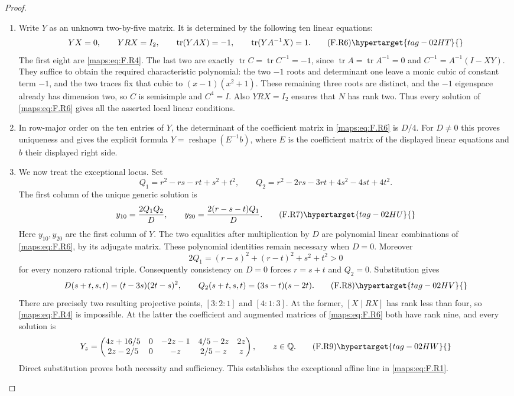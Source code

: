 \begin{proof}
\begin{enumerate}[label={$\langle1\rangle$\arabic*.}]
\item Write $Y$ as an unknown two-by-five matrix.  It is determined
by the following ten linear equations:
\[
 YX=0,\qquad YRX=I_2,\qquad
 \operatorname{tr}(YAX)=-1,\qquad
 \operatorname{tr}(YA^{-1}X)=1.
 \tag{F.R6}\hypertarget{tag-02HT}{}\label{maps:eq:F.R6}
\]
The first eight are \eqref{maps:eq:F.R4}.  The last two are exactly
$\operatorname{tr}C=\operatorname{tr}C^{-1}=-1$, since
$\operatorname{tr}A=\operatorname{tr}A^{-1}=0$ and
$C^{-1}=A^{-1}(I-XY)$.
They suffice to obtain the required characteristic
polynomial: the two $-1$ roots and determinant one leave a
monic cubic of constant term $-1$, and the two traces fix
that cubic to $(x-1)(x^2+1)$.
These remaining three roots are distinct, and the $-1$
eigenspace already has dimension two, so $C$ is semisimple
and $C^4=I$.  Also $YRX=I_2$ ensures that $N$ has rank two.
Thus every solution of \eqref{maps:eq:F.R6} gives all the asserted local
linear conditions.

\item In row-major order on the ten entries of $Y$, the determinant
of the coefficient matrix in \eqref{maps:eq:F.R6} is $D/4$.
For $D\ne0$ this proves uniqueness and gives the explicit
formula $Y=\operatorname{reshape}(E^{-1}b)$, where $E$ is
the coefficient matrix of the displayed linear equations
and $b$ their displayed right side.

\item We now treat the exceptional locus.
Set
\[
 Q_1=r^2-rs-rt+s^2+t^2,
 \qquad Q_2=r^2-2rs-3rt+4s^2-4st+4t^2.
\]
The first column of the unique generic solution is
\[
 y_{10}=\frac{2Q_1Q_2}{D},\qquad
 y_{20}=\frac{2(r-s-t)Q_1}{D}.
 \tag{F.R7}\hypertarget{tag-02HU}{}\label{maps:eq:F.R7}
\]
Here $y_{10},y_{20}$ are the first column of $Y$.
The two equalities after multiplication by $D$ are polynomial
linear combinations of \eqref{maps:eq:F.R6}, by its adjugate matrix.
These polynomial identities remain necessary when $D=0$.
Moreover
\[
 2Q_1=(r-s)^2+(r-t)^2+s^2+t^2>0
\]
for every nonzero rational triple.  Consequently consistency
on $D=0$ forces $r=s+t$ and $Q_2=0$.
Substitution gives
\[
 D(s+t,s,t)=(t-3s)(2t-s)^2,
 \qquad Q_2(s+t,s,t)=(3s-t)(s-2t).
 \tag{F.R8}\hypertarget{tag-02HV}{}\label{maps:eq:F.R8}
\]
There are precisely two resulting projective points,
$[3:2:1]$ and $[4:1:3]$.
At the former, $[X\mid RX]$ has rank less than four, so
\eqref{maps:eq:F.R4} is impossible.  At the latter the coefficient and
augmented matrices of \eqref{maps:eq:F.R6} both have rank nine, and every
solution is
\[
 Y_z=\begin{pmatrix}
 4z+16/5&0&-2z-1&4/5-2z&2z\\
 2z-2/5&0&-z&2/5-z&z
 \end{pmatrix},\qquad z\in\mathbb Q.
 \tag{F.R9}\hypertarget{tag-02HW}{}\label{maps:eq:F.R9}
\]
Direct substitution proves both necessity and sufficiency.
This establishes the exceptional affine line in \eqref{maps:eq:F.R1}.


\end{enumerate}
\end{proof}
